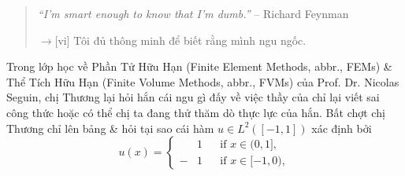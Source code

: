 \documentclass[12pt,oneside]{book}
\begin{document}
\begin{quote}
	{\it``I'm smart enough to know that I'm dumb.''} -- {\sc Richard Feynman}
	
	{\sf[en]$\to$[vi]} Tôi đủ thông minh để biết rằng mình ngu ngốc.
\end{quote}
Trong lớp học về Phần Tử Hữu Hạn (Finite Element Methods, abbr., FEMs) \& Thể Tích Hữu Hạn (Finite Volume Methods, abbr., FVMs) của Prof. Dr. {\sc Nicolas Seguin}, chị Thương lại hỏi hắn cái ngu gì đấy về việc thầy của chỉ lại viết sai công thức hoặc có thể chị ta đang thử thăm dò thực lực của hắn. Bất chợt chị Thương chỉ lên bảng \& hỏi tại sao cái hàm $u\in L^2([-1,1])$ xác định bởi
\begin{equation*}
	u(x) = \left\{\begin{split}
		&1&&\mbox{if } x\in(0,1],\\
		-&1&&\mbox{if } x\in[-1,0),
	\end{split}\right.
\end{equation*}
\end{document}
